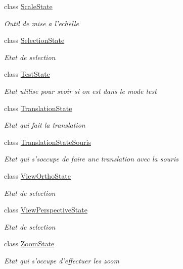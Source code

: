 \begin{DoxyCompactItemize}
class \hyperlink{class_interface_graphique_1_1patron__state_1_1_scale_state}{Scale\-State}
\begin{DoxyCompactList}\small\item\em Outil de mise a l'echelle \end{DoxyCompactList}\item 
class \hyperlink{class_interface_graphique_1_1patron__state_1_1_selection_state}{Selection\-State}
\begin{DoxyCompactList}\small\item\em Etat de selection \end{DoxyCompactList}\item 
class \hyperlink{class_interface_graphique_1_1patron__state_1_1_test_state}{Test\-State}
\begin{DoxyCompactList}\small\item\em Etat utilise pour svoir si on est dans le mode test \end{DoxyCompactList}\item 
class \hyperlink{class_interface_graphique_1_1patron__state_1_1_translation_state}{Translation\-State}
\begin{DoxyCompactList}\small\item\em Etat qui fait la translation \end{DoxyCompactList}\item 
class \hyperlink{class_interface_graphique_1_1patron__state_1_1_translation_state_souris}{Translation\-State\-Souris}
\begin{DoxyCompactList}\small\item\em Etat qui s'soccupe de faire une translation avec la souris \end{DoxyCompactList}\item 
class \hyperlink{class_interface_graphique_1_1patron__state_1_1_view_ortho_state}{View\-Ortho\-State}
\begin{DoxyCompactList}\small\item\em Etat de selection \end{DoxyCompactList}\item 
class \hyperlink{class_interface_graphique_1_1patron__state_1_1_view_perspective_state}{View\-Perspective\-State}
\begin{DoxyCompactList}\small\item\em Etat de selection \end{DoxyCompactList}\item 
class \hyperlink{class_interface_graphique_1_1patron__state_1_1_zoom_state}{Zoom\-State}
\begin{DoxyCompactList}\small\item\em Etat qui s'occupe d'effectuer les zoom \end{DoxyCompactList}\end{DoxyCompactItemize}
